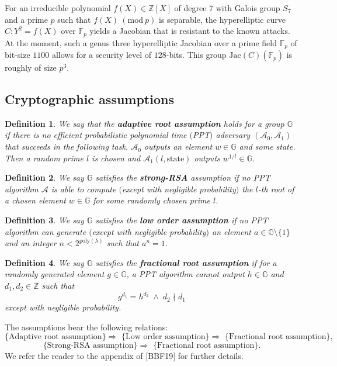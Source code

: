 \documentclass[11pt, lettersize, notitlepage, leqno, footskip=0.6cm]{article}
\newcommand{\bz}{\mathbb Z}
\newcommand{\bFp}{\mathbb{F}_p}
\newcommand{\imp}{\Longrightarrow}
\newcommand{\mc}{\mathcal}
\newcommand{\mb}{\mathbb}
\newcommand{\mr}{\mathrm}
\newcommand{\Jac}{\mr{Jac}}
\newcommand{\lam}{\lambda}
\newcommand{\vs}{\vspace{-0.15cm}}
\newcommand{\noin}{\noindent}
\newcommand{\Mod}[1]{\ (\mathrm{mod}\ #1)}
\newtheorem{Def}{Definition}[section]
\numberwithin{equation}{section}
\begin{document}
For an irreducible polynomial $f(X)\in \bz[X]$ of degree $7$ with Galois group $S_7$ and a prime $p$ such that $f(X)\Mod{p}$ is separable, the hyperelliptic curve $C:Y^2 = f(X)$ over $\bFp$ yields a Jacobian that is resistant to the known attacks. At the moment, such a genus three hyperelliptic Jacobian over a prime field $\bFp$ of bit-size $1100$ allows for a security level of $128$-bits. This group $\Jac(C)(\bFp)$ is roughly of size $p^3$. 


\subsection{\fontsize{11}{11} Cryptographic assumptions}

\begin{Def} We say that the \textbf{adaptive root assumption} holds for a group $\mb{G}$ if there is no efficient probabilistic polynomial time $($PPT$)$ adversary $(\mc{A}_0, \mc{A}_1)$ that succeeds in the following task. $\mc{A}_0$ outputs an element $w\in \mb{G}$ and some state. Then a random prime $l$ is chosen and $\mc{A}_1(l, \mr{state})$ outputs $w^{1/l}\in \mb{G}$. \end{Def}
 

\begin{Def} We say $\mb{G}$ satisfies the \textbf{strong-RSA} assumption if no PPT algorithm $\mc{A}$ is able to compute $($except with negligible probability$)$ the $l$-th root of a chosen element $w\in \mb{G}$ for some randomly chosen prime $l$.\end{Def}

\begin{Def} We say $\mb{G}$ satisfies the \textbf{low order assumption} if no PPT algorithm can generate $($except with negligible probability$)$ an element $a\in\mb{G}\setminus\{1\}$ and an integer $n< 2^{\mr{poly}(\lam)}$ such that $a^n = 1$.\end{Def}

\begin{Def} We say $\mb{G}$ satisfies the \textbf{fractional root assumption} if for a randomly generated element $g\in \mb{G}$, a PPT algorithm cannot output $h\in\mb{G}$ and $d_1,d_2\in\bz$ such that \vs $$g^{d_1} = h^{d_2}\;\wedge\; d_2 \nmid d_1$$ except with negligible probability.\end{Def}

\noin The assumptions bear the following relations: \vs $$\text{\{Adaptive root assumption\} }\imp \text{ \{Low order assumption\} } \imp \text{ \{Fractional root assumption\} },$$ \vspace{-0.6cm} $$\text{\{Strong-RSA assumption\} }\imp \text{ \{Fractional root assumption\}}. $$ We refer the reader to the appendix of [BBF19] for further details.
\end{document}
